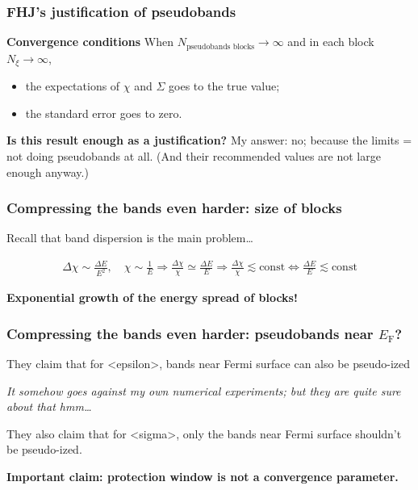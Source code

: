 \documentclass[t,aspectratio=169]{beamer}
\newcommand{\shortcode}[1]{\texttt{#1}}
\newcommand*{\const}{\text{const}}
\def\\{}%
\def\texttt#1{<#1>}%
\begin{document}
\begin{frame}
\frametitle{FHJ's justification of pseudobands}

\textbf{Convergence conditions} When $N_{\text{pseudobands blocks}} \to \infty$ and in each block $N_\xi \to \infty$, 
\begin{itemize}
    \item the expectations of $\chi$ and $\Sigma$ goes to the true value;
    \item the standard error goes to zero.
\end{itemize}

\textbf{Is this result enough as a justification?} My answer: no; 
because the limits = not doing pseudobands at all. 
(And their recommended values are not large enough anyway.)


\end{frame}

\begin{frame}
\frametitle{Compressing the bands even harder: size of blocks}

Recall that band dispersion is the main problem\dots

\[
    \begin{aligned}
        \Delta \chi \sim \frac{\Delta E}{E^2}, \quad \chi \sim \frac{1}{E} \Rightarrow
        \frac{\Delta \chi}{\chi} \simeq \frac{\Delta E}{E} \\
        \Rightarrow
        \frac{\Delta \chi}{\chi} \lesssim \const \Leftrightarrow \boxed{\frac{\Delta E}{E} \lesssim \const}
    \end{aligned}
\]

\textbf{Exponential growth of the energy spread of blocks!}

\end{frame}

\begin{frame}
\frametitle{Compressing the bands even harder: pseudobands near $E_{\text{F}}$?}

They claim that for \shortcode{epsilon}, 
bands near Fermi surface can also be pseudo-ized 

\emph{It somehow goes against my own numerical experiments; but they are quite sure about that hmm\dots}

They also claim that for \shortcode{sigma}, only the bands near Fermi surface shouldn't be pseudo-ized.

\textbf{Important claim: protection window is not a convergence parameter.} 

\end{frame}
\end{document}
